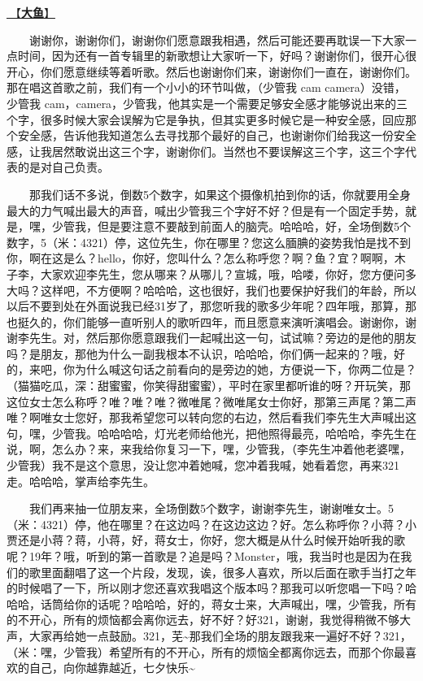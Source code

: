 \documentclass[]{ctexbook}
\begin{document}
\hyperref[big-fish]{🎵【\textbf{大鱼}】}

  谢谢你，谢谢你们，谢谢你们愿意跟我相遇，然后可能还要再耽误一下大家一点时间，因为还有一首专辑里的新歌想让大家听一下，好吗？谢谢你们，很开心很开心，你们愿意继续等着听歌。然后也谢谢你们来，谢谢你们一直在，谢谢你们。那在唱这首歌之前，我们有一个小小的环节叫做，（少管我 cam camera）没错，少管我 cam，camera，少管我，他其实是一个需要足够安全感才能够说出来的三个字，很多时候大家会误解为它是争执，但其实更多时候它是一种安全感，回应那个安全感，告诉他我知道怎么去寻找那个最好的自己，也谢谢你们给我这一份安全感，让我居然敢说出这三个字，谢谢你们。当然也不要误解这三个字，这三个字代表的是对自己负责。

  那我们话不多说，倒数5个数字，如果这个摄像机拍到你的话，你就要用全身最大的力气喊出最大的声音，喊出少管我三个字好不好？但是有一个固定手势，就是，嘿，少管我，但是要注意不要敲到前面人的脑壳。哈哈哈，好，全场倒数5个数字，5（米：4321）停，这位先生，你在哪里？您这么腼腆的姿势我怕是找不到你，啊在这是么？hello，你好，您叫什么？怎么称呼您？啊？鱼？宜？啊啊，木子李，大家欢迎李先生，您从哪来？从哪儿？宣城，哦，哈喽，你好，您方便问多大吗？这样吧，不方便啊？哈哈哈，这也很好，我们也要保护好我们的年龄，所以以后不要到处在外面说我已经31岁了，那您听我的歌多少年呢？四年哦，那算，那也挺久的，你们能够一直听别人的歌听四年，而且愿意来演听演唱会。谢谢你，谢谢李先生。对，然后那你愿意跟我们一起喊出这一句，试试嘛？旁边的是他的朋友吗？是朋友，那他为什么一副我根本不认识，哈哈哈，你们俩一起来的？哦，好的，来吧，你为什么喊这句话之前看向的是旁边的她，方便说一下，你两二位是？（猫猫吃瓜，深：甜蜜蜜，你笑得甜蜜蜜），平时在家里都听谁的呀？开玩笑，那这位女士怎么称呼？唯？唯？唯？微唯尾？微唯尾女士你好，那第三声尾？第二声唯？啊唯女士您好，那我希望您可以转向您的右边，然后看我们李先生大声喊出这句，嘿，少管我。哈哈哈哈，灯光老师给他光，把他照得最亮，哈哈哈，李先生在说，啊，怎么办？来，来我给你复习一下，嘿，少管我，（李先生冲着他老婆嘿，少管我）我不是这个意思，没让您冲着她喊，您冲着我喊，她看着您，再来321走。哈哈哈，掌声给李先生。

  我们再来抽一位朋友来，全场倒数5个数字，谢谢李先生，谢谢唯女士。5（米：4321）停，他在哪里？在这边吗？在这边这边？好。怎么称呼你？小蒋？小贾还是小蒋？蒋，小蒋，好，蒋女士，你好，您大概是从什么时候开始听我的歌呢？19年？哦，听到的第一首歌是？追是吗？Monster，哦，我当时也是因为在我们的歌里面翻唱了这一个片段，发现，诶，很多人喜欢，所以后面在歌手当打之年的时候唱了一下，所以刚才您还喜欢我唱这个版本吗？那我可以听您唱一下吗？哈哈哈，话筒给你的话呢？哈哈哈，好的，蒋女士来，大声喊出，嘿，少管我，所有的不开心，所有的烦恼都会离你远去，好不好？好321，谢谢，我觉得稍微不够大声，大家再给她一点鼓励。321，芜\textasciitilde 那我们全场的朋友跟我来一遍好不好？321，（米：嘿，少管我）希望所有的不开心，所有的烦恼全都离你远去，而那个你最喜欢的自己，向你越靠越近，七夕快乐\textasciitilde{}
\end{document}
